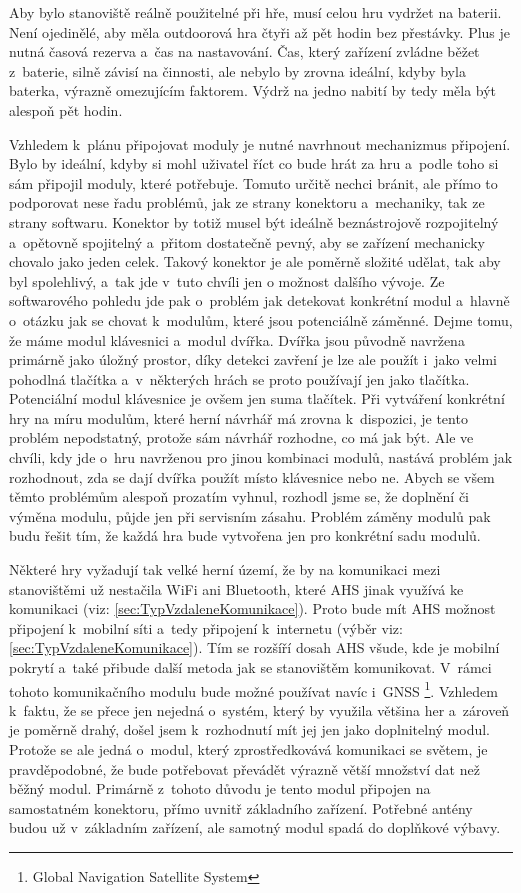 Aby bylo stanoviště reálně použitelné při hře, musí celou hru vydržet na baterii.
Není ojedinělé, aby měla outdoorová hra čtyři až pět hodin bez přestávky.
Plus je nutná časová rezerva a~čas na nastavování.
Čas, který zařízení zvládne běžet z~baterie, silně závisí na činnosti, ale nebylo by zrovna ideální, kdyby byla baterka, výrazně omezujícím faktorem.
Výdrž na jedno nabití by tedy měla být alespoň pět hodin.

Vzhledem k~plánu připojovat moduly je nutné navrhnout mechanizmus připojení.
Bylo by ideální, kdyby si mohl uživatel říct co bude hrát za hru a~podle toho si sám připojil moduly, které potřebuje.
Tomuto určitě nechci bránit, ale přímo to podporovat nese řadu problémů, jak ze strany konektoru a~mechaniky, tak ze strany softwaru.
Konektor by totiž musel být ideálně beznástrojově rozpojitelný a~opětovně spojitelný a~přitom dostatečně pevný, aby se zařízení mechanicky chovalo jako jeden celek.
Takový konektor je ale poměrně složité udělat, tak aby byl spolehlivý, a~tak jde v~tuto chvíli jen o možnost dalšího vývoje.
Ze softwarového pohledu jde pak o~problém jak detekovat konkrétní modul a~hlavně o~otázku jak se chovat k~modulům, které jsou potenciálně záměnné.
Dejme tomu, že máme modul klávesnici a~modul dvířka.
Dvířka jsou původně navržena primárně jako úložný prostor, díky detekci zavření je lze ale použít i~jako velmi pohodlná tlačítka a~v~některých hrách se proto používají jen jako tlačítka.
Potenciální modul klávesnice je ovšem jen suma tlačítek.
Při vytváření konkrétní hry na míru modulům, které herní návrhář má zrovna k~dispozici, je tento problém nepodstatný, protože sám návrhář rozhodne, co má jak být.
Ale ve chvíli, kdy jde o~hru navrženou pro jinou kombinaci modulů, nastává problém jak rozhodnout, zda se dají dvířka použít místo klávesnice nebo ne.
Abych se všem těmto problémům alespoň prozatím vyhnul, rozhodl jsme se, že doplnění či výměna modulu, půjde jen při servisním zásahu.
Problém záměny modulů pak budu řešit tím, že každá hra bude vytvořena jen pro konkrétní sadu modulů.

Některé hry vyžadují tak velké herní území, že by na komunikaci mezi stanovištěmi už nestačila WiFi ani Bluetooth, které AHS jinak využívá ke komunikaci (viz: \ref{sec:TypVzdaleneKomunikace}).
Proto bude mít AHS možnost připojení k~mobilní síti a~tedy připojení k~internetu (výběr viz: \ref{sec:TypVzdaleneKomunikace}).
Tím se rozšíří dosah AHS všude, kde je mobilní pokrytí a~také přibude další metoda jak se stanovištěm komunikovat.
V~rámci tohoto komunikačního modulu bude možné používat navíc i~GNSS \footnote{Global Navigation Satellite System}.
Vzhledem k~faktu, že se přece jen nejedná o~systém, který by využila většina her a~zároveň je poměrně drahý, došel jsem k~rozhodnutí mít jej jen jako doplnitelný modul.
Protože se ale jedná o~modul, který zprostředkovává komunikaci se světem, je pravděpodobné, že bude potřebovat převádět výrazně větší množství dat než běžný modul.
Primárně z~tohoto důvodu je tento modul připojen na samostatném konektoru, přímo uvnitř základního zařízení.
Potřebné antény budou už v~základním zařízení, ale samotný modul spadá do doplňkové výbavy.

